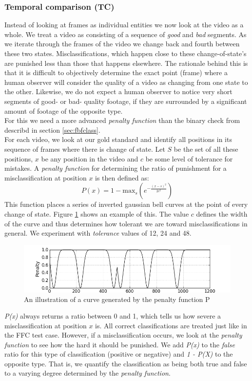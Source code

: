 \subsubsection{Temporal comparison (TC)}\label{sec:tempclass}
%
Instead of looking at frames as individual entities we now look at the video as a whole. We treat a video as consisting of a sequence of \textit{good} and \textit{bad} segments. As we iterate through the frames of the video we change back and fourth between these two states. Misclassifications, which happen close to these change-of-state's are punished less than those that happens elsewhere. The rationale behind this is that it is difficult to objectively determine the exact point (frame) where a human observer will consider the quality of a video as changing from one state to the other. Likewise, we do not expect a human observer to notice very short segments of good- or bad- quality footage, if they are surrounded by a significant amount of footage of the opposite type.\\
For this we need a more advanced \textit{penalty function} than the binary check from describd in section \ref{sec:fbfclass}.\\
For each video, we look at our gold standard and identify all positions in its sequence of frames where there is change of state. Let $S$ be the set of all these positions, $x$ be any position in the video and $c$ be some level of tolerance for mistakes. A \emph{penalty function} for determining the ratio of punishment for a misclassification at position $x$ is then defined as:
%
\begin{displaymath}
P(x) =1 - \text{max}_{s}(e^{-\frac{(x-s)^{2}}{2c^{2}}})
\end{displaymath}
%
This function places a series of inverted gaussian bell curves at the point of every change of state. Figure \ref{fig:penaltycurve} shows an example of this. The value $c$ defines the width of the curve and thus determines how tolerant we are toward misclassifications in general. We experiment with \textit{tolerance} values of 12, 24 and 48.
%
\begin{figure}
\includegraphics[width=1\textwidth]{img/penaltyfunction.jpg}
\caption{An illustration of a curve generated by the penalty function P}
\label{fig:penaltycurve}
\end{figure}
%
\emph{P(x)} always returns a ratio between 0 and 1, which tells us how severe a misclassification at position $x$ is. All correct classifications are treated just like in the FFC test case. However, if a misclassification occurs, we look at the \textit{penalty function} to see how the hard it should be punished. We add \textit{P(x)} to the \textit{false} ratio for this type of classification (positive or negative) and \textit{1 - P(X)} to the opposite type. That is, we quantify the classification as being both true and false to a varying degree determined by the \textit{penalty function}.
%

